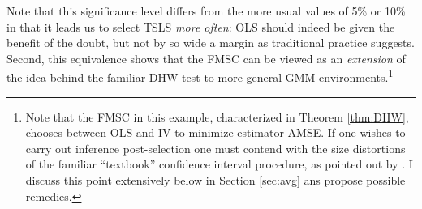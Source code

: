 Note that this significance level differs from the more usual values of 5\% or 10\% in that it leads us to select TSLS \emph{more often}: OLS should indeed be given the benefit of the doubt, but not by so wide a margin as traditional practice suggests. 
Second, this equivalence shows that the FMSC can be viewed as an \emph{extension} of the idea behind the familiar DHW test to more general GMM environments.\footnote{Note that the FMSC in this example, characterized in Theorem \ref{thm:DHW}, chooses between OLS and IV to minimize estimator AMSE. If one wishes to carry out inference post-selection one must contend with the size distortions of the familiar ``textbook'' confidence interval procedure, as pointed out by \cite{Guggenberger2010}. I discuss this point extensively below in Section \ref{sec:avg} ans propose possible remedies.}
